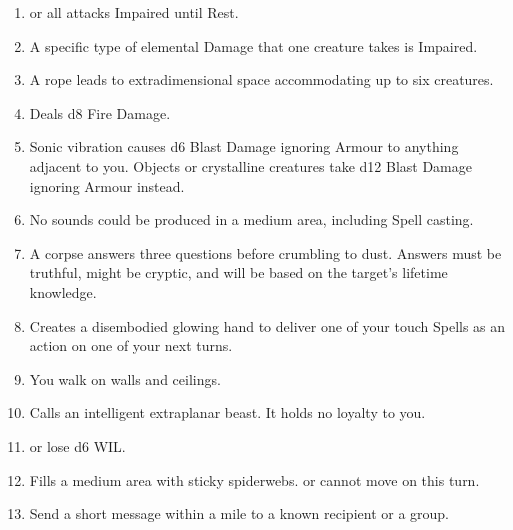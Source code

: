 \documentclass[itdr/core]{subfiles}
\begin{document}
\begin{enumerate}
	\item {}  or all attacks Impaired until Rest.
	\item {} A specific type of elemental Damage that one creature takes is Impaired.
	\item {} A rope leads to extradimensional space accommodating up to six creatures.
	\item {} Deals d8 Fire Damage.
	\item {} Sonic vibration causes d6 Blast Damage ignoring Armour to anything adjacent to you. Objects or crystalline creatures take d12 Blast Damage ignoring Armour instead.
	\item {} No sounds could be produced in a medium area, including Spell casting.
	\item {} A corpse answers three questions before crumbling to dust. Answers must be truthful, might be cryptic, and will be based on the target's lifetime knowledge.
	\item {} Creates a disembodied glowing hand to deliver one of your touch Spells as an action on one of your next turns.
	\item {} You walk on walls and ceilings.
	\item {} Calls an intelligent extraplanar beast. It holds no loyalty to you.
	\item {}  or lose d6 WIL.
	\item {} Fills a medium area with sticky spiderwebs.  or cannot move on this turn.
	\item {} Send a short message within a mile to a known recipient or a group.
\end{enumerate}

\vfill
\break
\end{document}

